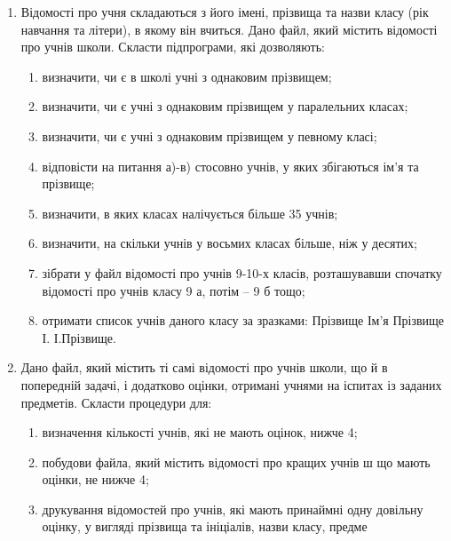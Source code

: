 \documentclass[]{article}
\makeatletter
\newcommand{\xslalph}[1]{\expandafter\@xslalph\csname c@#1\endcsname}
\newcommand{\@xslalph}[1]{%
    \ifcase#1\or а\or б\or в\or г\or д\or e\or є\or ж\or з\or i%
    \or й\or к\or л\or м\or н\or о\or п\or р\or с\or т%
    \or у\or ф\or х\or ц\or ч\or ш\or ю\or я\or аа\or бб\or вв %
    \else\@ctrerr\fi%
}
\makeatother
\begin{document}
\begin{enumerate}
\item  Відомості про учня складаються з його імені, прізвища та назви 
класу (рік  навчання  та  літери),  в  якому  він  вчиться.  Дано файл,  який 
містить відомості про учнів школи. Скласти підпрограми, які дозволяють:
\begin{enumerate}[label=\xslalph*)] 
\item визначити, чи є в школі учні з однаковим прізвищем; 
\item визначити, чи є учні з однаковим прізвищем у паралельних класах; 
\item визначити, чи є учні з однаковим прізвищем у певному класі; 
\item відповісти на питання а)-в) стосовно учнів, у яких збігаються ім'я та 
прізвище; 
\item визначити, в яких класах налічується більше 35 учнів; 
\item визначити, на скільки учнів у восьмих класах більше, ніж у десятих; 
\item  зібрати  у файл  відомості  про  учнів  9-10-х  класів,  розташувавши 
спочатку відомості про учнів класу 9 а, потім – 9 б тощо; 
\item отримати список учнів даного класу за зразками: 
  Прізвище Ім'я 
  Прізвище І. 
  І.Прізвище. 
\end{enumerate}

\item  Дано файл, який містить ті самі відомості про учнів школи, що й 
в  попередній  задачі,  і  додатково  оцінки,  отримані  учнями  на  іспитах  із 
заданих предметів. Скласти процедури для:
\begin{enumerate}[label=\xslalph*)]
\item
 визначення кількості учнів, які не мають оцінок, нижче 4;  
\item побудови файла, який містить відомості про кращих учнів ш
що мають оцінки, не нижче 4; 
\item друкування відомостей про учнів, які мають принаймні одну 
довільну оцінку, у вигляді прізвища та ініціалів, назви класу, предме
\end{enumerate}


\end{enumerate}
\end{document}
